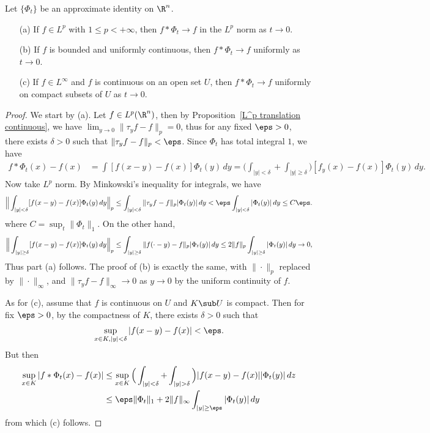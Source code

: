 \begin{theorem}\label{convolution approximate identity in L^p}
Let $\{\Phi_t\}$ be an approximate identity on $\R^n$.
\begin{itemize}
\item[(a)] If $f\in L^p$ with $1\leq p<+\infty$, then $f\ast\Phi_t\to f$ in the $L^p$ norm as $t\to 0$.
\item[(b)] If $f$ is bounded and uniformly continuous, then $f\ast\Phi_t\to f$ uniformly as $t\to 0$.
\item[(c)] If $f\in L^\infty$ and $f$ is continuous on an open set $U$, then $f\ast\Phi_t\to f$ uniformly on compact subsets of $U$ as $t\to 0$.
\end{itemize}
\end{theorem}
\begin{proof}
We start by (a). Let $f\in L^p(\R^n)$, then by Proposition~\ref{L^p translation continuous}, we have $\lim_{y\to 0}\|\tau_yf-f\|_p=0$, thus for any fixed $\eps>0$, there exists $\delta>0$ such that $\|\tau_yf-f\|_p<\eps$. Since $\Phi_t$ has total integral $1$, we have
\begin{align*}
f\ast\Phi_t(x)-f(x)&=\int[f(x-y)-f(x)]\Phi_t(y)\,dy=\Big(\int_{|y|<\delta}+\int_{|y|\geq\delta}\Big)[f_y(x)-f(x)]\Phi_t(y)\,dy.
\end{align*}
Now take $L^p$ norm. By Minkowski's inequality for integrals, we have
\begin{align*}
\Big\|\int_{|y|<\delta}[f(x-y)-f(x)]\Phi_t(y)\,dy\Big\|_p\leq\int_{|y|<\delta}\|\tau_yf-f\|_p|\Phi_t(y)|\,dy<\eps\int_{|y|<\delta}|\Phi_t(y)|\,dy\leq C\eps.
\end{align*}
where $C=\sup_t\|\Phi_t\|_1$. On the other hand,
\begin{equation*}\small
\begin{aligned}
\Big\|\int_{|y|\geq\delta}[f(x-y)-f(x)]\Phi_t(y)\,dy\Big\|_p\leq\int_{|y|\geq\delta}\|f(\cdot-y)-f\|_p|\Phi_t(y)|\,dy\leq 2\|f\|_p\int_{|y|\geq\delta}|\Phi_t(y)|\,dy\to 0,
\end{aligned}
\end{equation*}
Thus part (a) follows. The proof of (b) is exactly the same, with $\|\cdot\|_p$ replaced by $\|\cdot\|_{\infty}$, and $\|\tau_{y}f-f\|_\infty\to 0$ as $y\to 0$ by the uniform continuity of $f$.\par
As for (c), assume that $f$ is continuous on $U$ and $K\sub U$ is compact. Then for fix $\eps>0$, by the compactness of $K$, there exists $\delta>0$ such that
\[\sup_{x\in K,|y|<\delta}|f(x-y)-f(x)|<\eps.\]
But then
\begin{align*}
\sup_{x\in K}|f\ast\Phi_t(x)-f(x)|&\leq\sup_{x\in K}\Big(\int_{|y|<\delta}+\int_{|y|>\delta}\Big)|f(x-y)-f(x)||\Phi_t(y)|\,dz\\
&\leq\eps\|\Phi_t\|_1+2\|f\|_\infty\int_{|y|\geq\eps}|\Phi_t(y)|\,dy
\end{align*}
from which (c) follows.
\end{proof}
